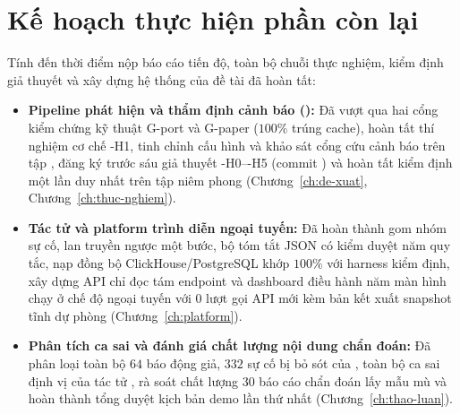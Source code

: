 
{}
\section*{Kế hoạch thực hiện phần còn lại}
\label{sec:ke-hoach}

Tính đến thời điểm nộp báo cáo tiến độ, toàn bộ chuỗi thực nghiệm, kiểm định giả thuyết và xây dựng hệ thống của đề tài đã hoàn tất:
\begin{itemize}[label=--]
  \item \textbf{Pipeline phát hiện và thẩm định cảnh báo (\CTAV{}):} Đã vượt qua hai cổng kiểm chứng kỹ thuật G-port và G-paper ($100\%$ trúng cache), hoàn tất thí nghiệm cơ chế \hyp{H1}, tinh chỉnh cấu hình và khảo sát cổng cứu cảnh báo  trên tập , đăng ký trước sáu giả thuyết \hyp{H0}--\hyp{H5} (commit ) và hoàn tất kiểm định một lần duy nhất trên tập  niêm phong (Chương~\ref{ch:de-xuat}, Chương~\ref{ch:thuc-nghiem}).
  \item \textbf{Tác tử  và platform trình diễn ngoại tuyến:} Đã hoàn thành gom nhóm sự cố, lan truyền ngược một bước, bộ tóm tắt JSON có kiểm duyệt năm quy tắc, nạp đồng bộ ClickHouse/PostgreSQL khớp $100\%$ với harness kiểm định, xây dựng API chỉ đọc tám endpoint và dashboard điều hành năm màn hình chạy ở chế độ ngoại tuyến  với $0$ lượt gọi API mới kèm bản kết xuất snapshot tĩnh dự phòng (Chương~\ref{ch:platform}).
  \item \textbf{Phân tích ca sai và đánh giá chất lượng nội dung chẩn đoán:} Đã phân loại toàn bộ $64$ báo động giả, $332$ sự cố bị bỏ sót của \CTAV{}, toàn bộ ca sai định vị của tác tử , rà soát chất lượng $30$ báo cáo chẩn đoán lấy mẫu mù và hoàn thành tổng duyệt kịch bản demo lần thứ nhất (Chương~\ref{ch:thao-luan}).
\end{itemize}


